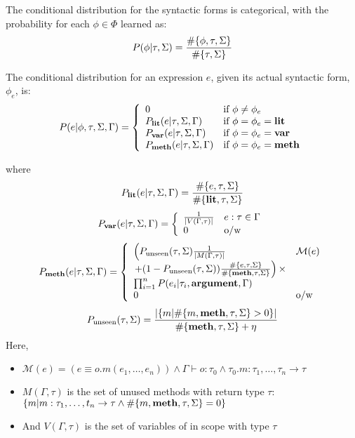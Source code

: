 \documentclass[landscape,final,a0paper,fontscale=0.297]{baposter}
\newcommand{\compresslist}{%
\setlength{\itemsep}{1pt}%
\setlength{\parskip}{0pt}%
\setlength{\parsep}{0pt}%
}
\newcommand{\firstitem}{\item\vskip-5pt}
\begin{document}
\begin{poster}
{  
  The conditional distribution for the syntactic forms is categorical, with the probability for each $\phi \in \Phi$ learned as:
  $$P(\phi | \tau, \Sigma) = \frac{\#\{\phi,\tau, \Sigma\}}{\#\{\tau, \Sigma\}}$$
  
  The conditional distribution for an expression $e$, given its actual syntactic form, $\phi_e$, is:
  \vskip-15pt
$$P(e | \phi, \tau, \Sigma, \Gamma) =
\left\{
	\begin{array}{ll}
		0  & \mbox{if } \phi \neq \phi_e \\
		P_{\textbf{lit}}(e | \tau, \Sigma, \Gamma) & \mbox{if } \phi = \phi_e = \textbf{lit}\\
		P_{\textbf{var}}(e | \tau, \Sigma, \Gamma) & \mbox{if } \phi = \phi_e = \textbf{var}\\
		P_{\textbf{meth}}(e | \tau, \Sigma, \Gamma) & \mbox{if } \phi = \phi_e = \textbf{meth}
	\end{array}
\right.
$$

where
  \vskip-13pt
$$P_{\textbf{lit}}(e | \tau, \Sigma, \Gamma) = \frac{\#\{e, \tau, \Sigma\}}{\#\{\textbf{lit}, \tau, \Sigma\}}$$
$$P_{\textbf{var}}(e | \tau, \Sigma, \Gamma) = 
\left\{
	\begin{array}{ll}
	\frac{1}{|V(\Gamma, \tau)|} & e : \tau \in \Gamma\\
	0 & \mbox{o/w}
	\end{array}
\right.$$
$$P_{\textbf{meth}}(e | \tau, \Sigma, \Gamma) = 
\left\{
	\begin{array}{ll}
          \left(P_{\text{unseen}}(\tau, \Sigma)\frac{1}{|M(\Gamma, \tau)|}\right. & \mathcal{M}(e) \\
	\left. + (1 - P_{\text{unseen}}(\tau, \Sigma))\frac{\#\{e, \tau, \Sigma\}}{\#\{\textbf{meth}, \tau, \Sigma\}} \right) \times & \\
	  \prod_{i=1}^n P(e_i | \tau_i, \textbf{argument}, \Gamma)& \\
	0 & \mbox{o/w}
	\end{array}
\right.$$
  \vskip-8pt
$$P_{\text{unseen}}(\tau, \Sigma) = \frac{ |\{m | \#\{m, \textbf{meth}, \tau, \Sigma\} > 0\}|}{\#\{\textbf{meth}, \tau, \Sigma\} + \eta}$$
Here, 
  \begin{itemize}\compresslist
    \firstitem $\mathcal{M}(e) = (e \equiv o.m(e_1, \ldots, e_n))  \land \Gamma \vdash o : \tau_0 \land \tau_0.m : \tau_1, \ldots, \tau_n \to \tau$
    \item $M(\Gamma, \tau)$ is the set of unused methods with return type $\tau$: \\ $\{m | m : \tau_1, \ldots, t_n \to \tau \land \#\{m, \textbf{meth}, \tau, \Sigma\} = 0\}$
    \item And $V(\Gamma, \tau)$ is the set of variables of  in scope with type $\tau$
  \end{itemize}
    }


\end{poster}
\end{document}

